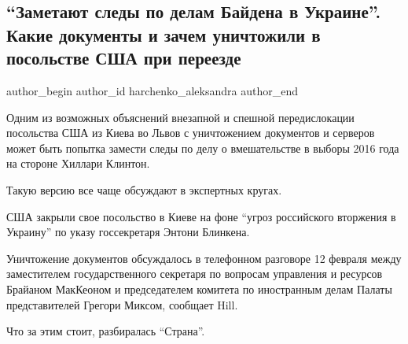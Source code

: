  
 
 
 
 
 
\subsection{\enquote{Заметают следы по делам Байдена в Украине}. Какие документы и зачем уничтожили в посольстве США при переезде}
\label{sec:18_02_2022.stz.news.ua.strana.1.dokumenty_usa_posolstvo_kiev}
 
\ifcmt
 author_begin
   author_id harchenko_aleksandra
 author_end
\fi

Одним из возможных объяснений внезапной и спешной передислокации посольства США
из Киева во Львов с уничтожением документов и серверов может быть попытка
замести следы по делу о вмешательстве в выборы 2016 года на стороне Хиллари
Клинтон.


Такую версию все чаще обсуждают в экспертных кругах.

США закрыли свое посольство в Киеве на фоне \enquote{угроз российского
вторжения в Украину} по указу госсекретаря Энтони Блинкена.  

Уничтожение документов обсуждалось в телефонном разговоре 12 февраля между
заместителем государственного секретаря по вопросам управления и ресурсов
Брайаном МакКеоном и председателем комитета по иностранным делам Палаты
представителей Грегори Миксом, сообщает Hill.

Что за этим стоит, разбиралась \enquote{Страна}.
